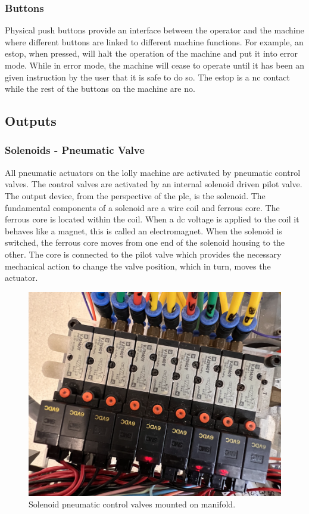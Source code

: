     
    \subsubsection{Buttons}
    Physical push buttons provide an interface between the operator and the machine where different buttons are linked to different machine functions. For example, an \acrfull{estop}, when pressed, will halt the operation of the machine and put it into error mode. While in error mode, the machine will cease to operate until it has been an given instruction by the user that it is safe to do so. The \acrshort{estop} is a \acrshort{nc} contact while the rest of the buttons on the machine are \acrshort{no}.
\newpage
    
\subsection{Outputs}
    \subsubsection{Solenoids - Pneumatic Valve}
    All pneumatic actuators on the lolly machine are activated by pneumatic control valves. The control valves are activated by an internal solenoid driven pilot valve.  The output device, from the perspective of the \acrshort{plc}, is the solenoid. The fundamental components of a solenoid are a wire coil and ferrous core. The ferrous core is located within the coil. When a \acrshort{dc} voltage is applied to the coil it behaves like a magnet, this is called an electromagnet. When the solenoid is switched, the ferrous core moves from one end of the solenoid housing to the other. The core is connected to the pilot valve which provides the necessary mechanical action to change the valve position, which in turn, moves the actuator. 
    
        \begin{figure}[H]
            \centering
            \includegraphics[scale = 0.5]{2_images/controlValvesPic.png}
            \caption{Solenoid pneumatic control valves mounted on manifold.}
            \label{fig:controlValvesPic}
        \end{figure} 
    \newpage
